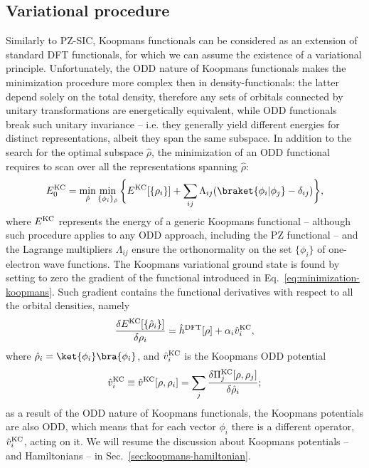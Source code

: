 \subsection{Variational procedure\label{sec:variational-procedure}}
Similarly to PZ-SIC, Koopmans functionals can be considered as an extension of standard DFT functionals, for which we can assume the existence of a variational principle. Unfortunately, the ODD nature of Koopmans functionals makes the minimization procedure more complex then in density-functionals: the latter depend solely on the total density, therefore any sets of orbitals connected by unitary transformations are energetically equivalent, while ODD functionals break such unitary invariance -- i.e. they generally yield different energies for distinct representations, albeit they span the same subspace. In addition to the search for the optimal subspace $\hat{\rho}$, the minimization of an ODD functional requires to scan over all the representations spanning $\hat{\rho}$:
%
\begin{equation}
    E^{\rm KC}_0 = \min_{\hat{\rho}} \min_{\{ \phi_i \}_{\hat{\rho}}} \bigg\{ E^{\rm KC}[\{ \rho_i \}] + \sum_{ij} \Lambda_{ij} (\braket{\phi_i|\phi_j} - \delta_{ij}) \bigg\} ,
    \label{eq:minimization-koopmans}
\end{equation}
%
where $E^{\rm KC}$ represents the energy of a generic Koopmans functional -- although such procedure applies to any ODD approach, including the PZ functional -- and the Lagrange multipliers $\Lambda_{ij}$ ensure the orthonormality on the set $\{ \phi_i \}$ of one-electron wave functions. The Koopmans variational ground state is found by setting to zero the gradient of the functional introduced in Eq.~\eqref{eq:minimization-koopmans}. Such gradient contains the functional derivatives with respect to all the orbital densities, namely
%
\begin{equation}
    \frac{\delta E^{\rm KC}[\{ \hat{\rho}_i \}]}{\delta \rho_i} = \hat{h}^{\rm DFT}[\rho] + \alpha_i \hat{v}^{\rm KC}_i ,
    \label{eq:koopmans-functional-derivative}
\end{equation}
%
where $\hat{\rho}_i = \ket{\phi_i} \bra{\phi_i}$, and $\hat{v}_i^{\rm KC}$ is the Koopmans ODD potential
%
\begin{equation}
    \hat{v}^{\rm KC}_i \equiv \hat{v}^{\rm KC}[\rho,\rho_i] = \sum_j \frac{\delta \Pi_j^{\rm KC}[\rho,\rho_j]}{\delta \hat{\rho}_i} ;
    \label{eq:koopmans-ith-potential}
\end{equation}
%
as a result of the ODD nature of Koopmans functionals, the Koopmans potentials are also ODD, which means that for each vector $\phi_i$ there is a different operator, $\hat{v}_i^{\rm KC}$, acting on it. We will resume the discussion about Koopmans potentials -- and Hamiltonians -- in Sec.~\ref{sec:koopmans-hamiltonian}.

